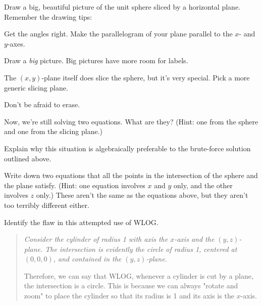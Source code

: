\documentclass[12pt]{exam}
\theoremstyle{definition}
\begin{document}
\begin{questions}

\question Draw a big, beautiful picture of the unit sphere sliced by a horizontal plane. Remember the drawing tips:
\begin{compactitem}
    \item Get the angles right. Make the parallelogram of your plane parallel to the $x$- and $y$-axes.
    \item Draw a \emph{big} picture. Big pictures have more room for labels.
    \item The $(x,y)$-plane itself does slice the sphere, but it's very special. Pick a more generic slicing plane.
    \item Don't be afraid to erase.
\end{compactitem}

\newpage

\question Now, we're still solving two equations. What are they? (Hint: one from the sphere and one from the slicing plane.)


\question Explain why this situation is algebraically preferable to the brute-force solution outlined above.


\question Write down two equations that all the points in the intersection of the sphere and the plane satisfy. (Hint: one equation involves $x$ and $y$ only, and the other involves $z$ only.) These aren't the same as the equations above, but they aren't too terribly different either.


\question Identify the flaw in this attempted use of WLOG.

\begin{quote}
    {\em Consider the cylinder of radius 1 with axis the $x$-axis and the $(y,z)$-plane. The intersection is evidently the circle of radius 1, centered at $(0,0,0)$, and contained in the $(y,z)$-plane. 

    Therefore, we can say that WLOG, whenever a cylinder is cut by a plane, the intersection is a circle. This is because we can always "rotate and zoom" to place the cylinder so that its radius is 1 and its axis is the $x$-axis.}
\end{quote}


\end{questions} 
\end{document}
